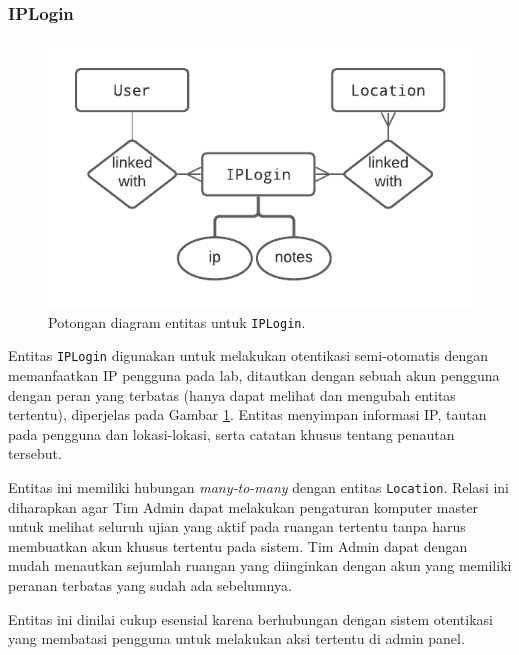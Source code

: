 \subsubsection{IPLogin}
    \begin{figure}
        \centering
        \includegraphics{Gambar/erd-details/ERD--New - IPLogin.pdf}
        \caption{Potongan diagram entitas untuk \texttt{IPLogin}.}
        \label{fig:erd_iplogin}
    \end{figure}
    Entitas \texttt{IPLogin} digunakan untuk melakukan otentikasi semi-otomatis dengan memanfaatkan IP
    pengguna pada lab, ditautkan dengan sebuah akun pengguna dengan peran yang terbatas (hanya
    dapat melihat dan mengubah entitas tertentu), diperjelas pada Gambar \ref{fig:erd_iplogin}.
    Entitas menyimpan informasi IP, tautan pada pengguna dan lokasi-lokasi, serta catatan khusus
    tentang penautan tersebut. 
    
    Entitas ini memiliki hubungan \textit{many-to-many} dengan entitas \texttt{Location}. Relasi
    ini diharapkan agar Tim Admin dapat melakukan pengaturan komputer master untuk melihat 
    seluruh ujian yang aktif pada ruangan tertentu tanpa harus membuatkan akun khusus 
    tertentu pada sistem. Tim Admin dapat dengan mudah menautkan sejumlah ruangan yang diinginkan
    dengan akun yang memiliki peranan terbatas yang sudah ada sebelumnya.
    
    Entitas ini dinilai cukup esensial karena berhubungan dengan sistem otentikasi yang membatasi
    pengguna untuk melakukan aksi tertentu di admin panel.
    
